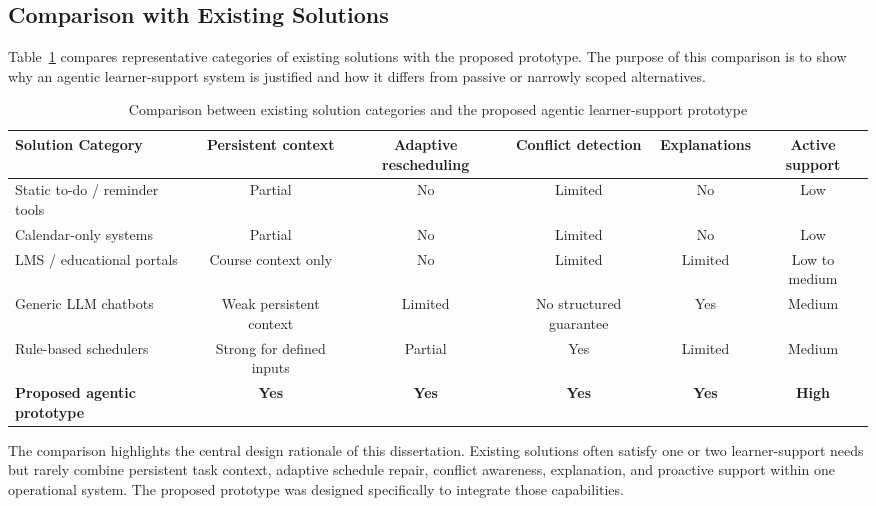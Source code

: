 \documentclass[12pt]{article}
\begin{document}
\subsection{Comparison with Existing Solutions}
Table~\ref{tab:existing_solution_comparison} compares representative categories of existing solutions with the proposed prototype. The purpose of this comparison is to show why an agentic learner-support system is justified and how it differs from passive or narrowly scoped alternatives.

\begin{table}[h!]
\centering
\small
\begin{tabular}{|p{3.0cm}|c|c|c|c|c|}
\hline
\textbf{Solution Category} & \textbf{Persistent context} & \textbf{Adaptive rescheduling} & \textbf{Conflict detection} & \textbf{Explanations} & \textbf{Active support} \\
\hline
Static to-do / reminder tools & Partial & No & Limited & No & Low \\
\hline
Calendar-only systems & Partial & No & Limited & No & Low \\
\hline
LMS / educational portals & Course context only & No & Limited & Limited & Low to medium \\
\hline
Generic LLM chatbots & Weak persistent context & Limited & No structured guarantee & Yes & Medium \\
\hline
Rule-based schedulers & Strong for defined inputs & Partial & Yes & Limited & Medium \\
\hline
\textbf{Proposed agentic prototype} & \textbf{Yes} & \textbf{Yes} & \textbf{Yes} & \textbf{Yes} & \textbf{High} \\
\hline
\end{tabular}
\caption{Comparison between existing solution categories and the proposed agentic learner-support prototype}
\label{tab:existing_solution_comparison}
\end{table}

The comparison highlights the central design rationale of this dissertation. Existing solutions often satisfy one or two learner-support needs but rarely combine persistent task context, adaptive schedule repair, conflict awareness, explanation, and proactive support within one operational system. The proposed prototype was designed specifically to integrate those capabilities.
\end{document}
